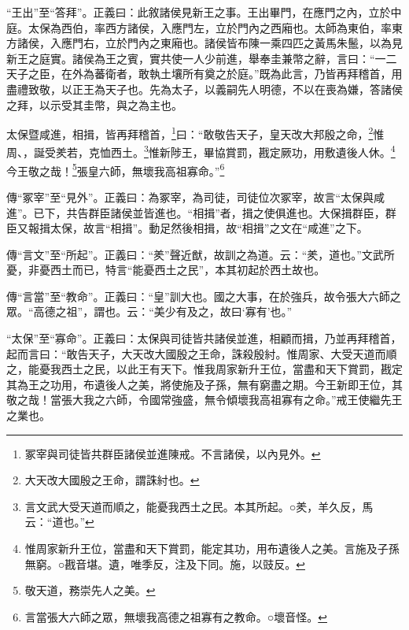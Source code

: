 {\noindent\shu{}\fzkt “王出”至“答拜”。正義曰：此敘諸侯見新王之事。王出畢門，在應門之內，立於中庭。太保為西伯，率西方諸侯，入應門左，立於門內之西廂也。太師為東伯，率東方諸侯，入應門右，立於門內之東廂也。諸侯皆布陳一乘四匹之黃馬朱鬛，以為見新王之庭實。諸侯為王之賓，實共使一人少前進，舉奉圭兼幣之辭，言曰：“一二天子之臣，在外為蕃衛者，敢執土壤所有奠之於庭。”既為此言，乃皆再拜稽首，用盡禮致敬，以正王為天子也。先為太子，以義嗣先人明德，不以在喪為嫌，答諸侯之拜，以示受其圭幣，與之為主也。 \par}

太保暨咸進，相揖，皆再拜稽首，\footnote{冢宰與司徒皆共群臣諸侯並進陳戒。不言諸侯，以內見外。}曰：“敢敬告天子，皇天改大邦殷之命，\footnote{大天改大國殷之王命，謂誅紂也。}惟周、，誕受羑若，克恤西土。\footnote{言文武大受天道而順之，能憂我西土之民。本其所起。○羑，羊久反，馬云：“道也。”}惟新陟王，畢協賞罰，戡定厥功，用敷遺後人休。\footnote{惟周家新升王位，當盡和天下賞罰，能定其功，用布遺後人之美。言施及子孫無窮。○戡音堪。遺，唯季反，注及下同。施，以豉反。}今王敬之哉！\footnote{敬天道，務崇先人之美。}張皇六師，無壞我高祖寡命。”\footnote{言當張大六師之眾，無壞我高德之祖寡有之教命。○壞音怪。}


{\noindent\zhuan{}\fzbyks 傳“冢宰”至“見外”。正義曰：為冢宰，為司徒，司徒位次冢宰，故言“太保與咸進”。已下，共告群臣諸侯並皆進也。“相揖”者，揖之使俱進也。大保揖群臣，群臣又報揖太保，故言“相揖”。動足然後相揖，故“相揖”之文在“咸進”之下。 \par}

{\noindent\zhuan{}\fzbyks 傳“言文”至“所起”。正義曰：“羑”聲近猷，故訓之為道。云：“羑，道也。”文武所憂，非憂西土而已，特言“能憂西土之民”，本其初起於西土故也。 \par}

{\noindent\zhuan{}\fzbyks 傳“言當”至“教命”。正義曰：“皇”訓大也。國之大事，在於強兵，故令張大六師之眾。“高德之祖”，謂也。云：“美少有及之，故曰‘寡有’也。” \par}

{\noindent\shu{}\fzkt “太保”至“寡命”。正義曰：太保與司徒皆共諸侯並進，相顧而揖，乃並再拜稽首，起而言曰：“敢告天子，大天改大國殷之王命，誅殺殷紂。惟周家、大受天道而順之，能憂我西土之民，以此王有天下。惟我周家新升王位，當盡和天下賞罰，戡定其為王之功用，布遺後人之美，將使施及子孫，無有窮盡之期。今王新即王位，其敬之哉！當張大我之六師，令國常強盛，無令傾壞我高祖寡有之命。”戒王使繼先王之業也。 \par}

